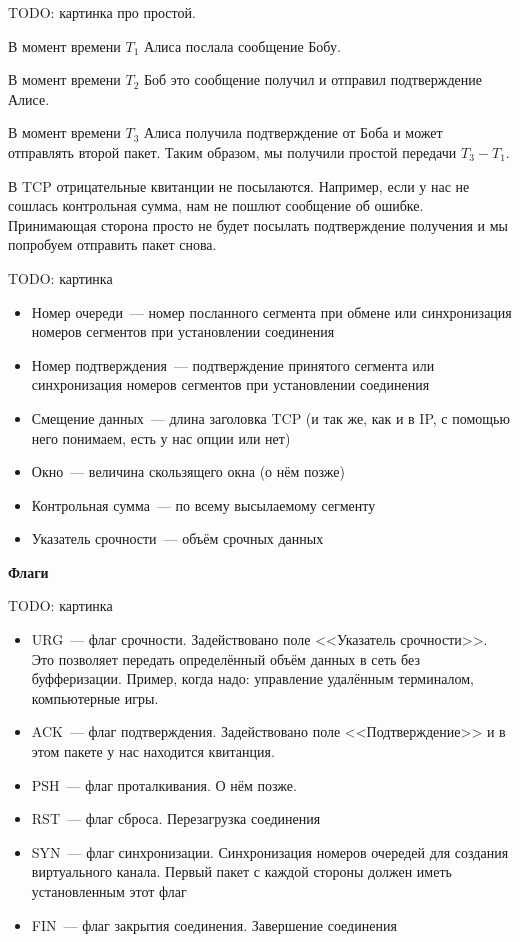 TODO: картинка про простой.

В момент времени $T_1$ Алиса послала сообщение Бобу.

В момент времени $T_2$ Боб это сообщение получил и отправил подтверждение Алисе.

В момент времени $T_3$ Алиса получила подтверждение от Боба и может отправлять второй пакет. Таким образом, мы получили простой передачи $T_3-T_1$.

В TCP отрицательные квитанции не посылаются. Например, если у нас не сошлась контрольная сумма, нам не пошлют сообщение об ошибке. Принимающая сторона просто не будет посылать подтверждение получения и мы попробуем отправить пакет снова.


TODO: картинка

\begin{itemize}
    \item Номер очереди~--- номер посланного сегмента при обмене или синхронизация номеров сегментов при установлении соединения
    \item Номер подтверждения~--- подтверждение принятого сегмента или синхронизация номеров сегментов при установлении соединения
    \item Смещение данных~--- длина заголовка TCP (и так же, как и в IP, с помощью него понимаем, есть у нас опции или нет)
    \item Окно~--- величина скользящего окна (о нём позже)
    \item Контрольная сумма~--- по всему высылаемому сегменту
    \item Указатель срочности~--- объём срочных данных

\end{itemize}

{\bf Флаги}

TODO: картинка

\begin{itemize}
    \item URG~--- флаг срочности. Задействовано поле <<Указатель срочности>>. Это позволяет передать определённый объём данных в сеть без буфферизации. Пример, когда надо: управление удалённым терминалом, компьютерные игры.
    \item ACK~--- флаг подтверждения. Задействовано поле <<Подтверждение>> и в этом пакете у нас находится квитанция.
    \item PSH~--- флаг проталкивания. О нём позже.
    \item RST~--- флаг сброса. Перезагрузка соединения
    \item SYN~--- флаг синхронизации. Синхронизация номеров очередей для создания виртуального канала. Первый пакет с каждой стороны должен иметь установленным этот флаг
    \item FIN~--- флаг закрытия соединения. Завершение соединения
\end{itemize}

